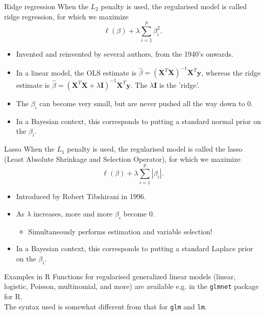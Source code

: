 \documentclass[10pt,handout]{beamer}
\begin{document}
\begin{frame}{Ridge regression}
When the $L_2$ penalty is used, the regularised model is called {\color{uured}ridge regression}, for which we maximize
$$\ell(\beta)+\lambda\sum_{i=1}^p\beta_i^2.$$
\begin{itemize}
\item Invented and reinvented by several authors, from the 1940's onwards.\\[3mm]\pause
\item In a linear model, the OLS estimate is $\hat{\beta}=(\mathbf{X}^T\mathbf{X})^{-1}\mathbf{X}^T\mathbf{y}$, whereas the ridge estimate is $\hat{\beta}=(\mathbf{X}^T\mathbf{X}+\lambda \mathbf{I})^{-1}\mathbf{X}^T\mathbf{y}$. The $\lambda \mathbf{I}$ is the 'ridge'.\\[3mm]\pause
\item The $\beta_i$ can become very small, but are never pushed all the way down to 0.\\[3mm]\pause
\item In a Bayesian context, this corresponds to putting a standard normal prior on the $\beta_i$.
\end{itemize}
\end{frame}

\begin{frame}{Lasso}
When the $L_1$ penalty is used, the regularised model is called the {\color{uured}lasso} (Least Absolute Shrinkage and Selection Operator), for which we maximize
$$\ell(\beta)+\lambda\sum_{i=1}^p|\beta_i|.$$
\begin{itemize}
\item Introduced by Robert Tibshirani in 1996.\\[3mm]\pause
\item As $\lambda$ increases, more and more $\beta_i$ become 0.\pause
\begin{itemize}
\item Simultaneously performs estimation and variable selection!\\[3mm]\pause
\end{itemize}
\item In a Bayesian context, this corresponds to putting a standard Laplace prior on the $\beta_i$.
\end{itemize}
\end{frame}

\begin{frame}{Examples in R}
Functions for regularised generalized linear models (linear, logistic, Poisson, multinomial, and more) are available e.g. in the \texttt{glmnet} package for R.\\[3mm]\pause
The syntax used is somewhat different from that for \texttt{glm} and \texttt{lm}.\\[3mm]
\end{frame}
\end{document}
